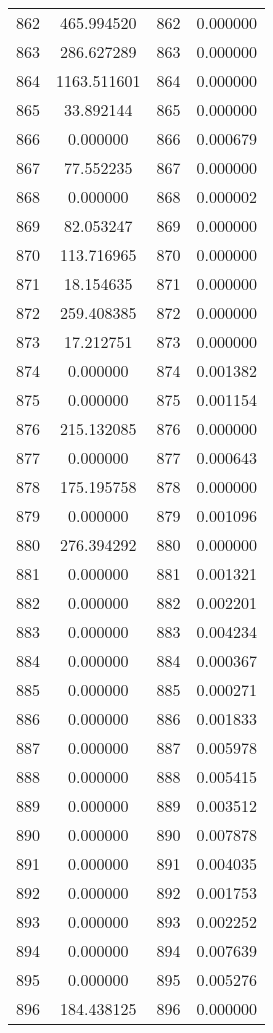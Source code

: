 \documentclass[12pt]{article}
\begin{document}
\begin{longtable}{@{}cccc@{}}
862 & 465.994520 & 862 & 0.000000 \\
863 & 286.627289 & 863 & 0.000000 \\
864 & 1163.511601 & 864 & 0.000000 \\
865 & 33.892144 & 865 & 0.000000 \\
866 & 0.000000 & 866 & 0.000679 \\
867 & 77.552235 & 867 & 0.000000 \\
868 & 0.000000 & 868 & 0.000002 \\
869 & 82.053247 & 869 & 0.000000 \\
870 & 113.716965 & 870 & 0.000000 \\
871 & 18.154635 & 871 & 0.000000 \\
872 & 259.408385 & 872 & 0.000000 \\
873 & 17.212751 & 873 & 0.000000 \\
874 & 0.000000 & 874 & 0.001382 \\
875 & 0.000000 & 875 & 0.001154 \\
876 & 215.132085 & 876 & 0.000000 \\
877 & 0.000000 & 877 & 0.000643 \\
878 & 175.195758 & 878 & 0.000000 \\
879 & 0.000000 & 879 & 0.001096 \\
880 & 276.394292 & 880 & 0.000000 \\
881 & 0.000000 & 881 & 0.001321 \\
882 & 0.000000 & 882 & 0.002201 \\
883 & 0.000000 & 883 & 0.004234 \\
884 & 0.000000 & 884 & 0.000367 \\
885 & 0.000000 & 885 & 0.000271 \\
886 & 0.000000 & 886 & 0.001833 \\
887 & 0.000000 & 887 & 0.005978 \\
888 & 0.000000 & 888 & 0.005415 \\
889 & 0.000000 & 889 & 0.003512 \\
890 & 0.000000 & 890 & 0.007878 \\
891 & 0.000000 & 891 & 0.004035 \\
892 & 0.000000 & 892 & 0.001753 \\
893 & 0.000000 & 893 & 0.002252 \\
894 & 0.000000 & 894 & 0.007639 \\
895 & 0.000000 & 895 & 0.005276 \\
896 & 184.438125 & 896 & 0.000000 \\

\end{longtable}
\end{document}
